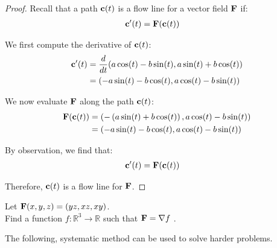 \begin{proof}

Recall that a path \(\vb{c}(t)\) is a flow line for a vector field \(\vb{F}\) if:
\begin{align}
    \vb{c}'(t) &= \vb{F}(\vb{c}(t))
\end{align}

We first compute the derivative of \(\vb{c}(t)\):
\begin{align*}
    \vb{c}'(t) &= \frac{d}{dt}(a \cos(t) - b \sin(t) , a \sin(t) + b \cos(t)) \\
    &= (-a \sin(t) - b \cos(t) , a \cos(t) - b \sin(t))
\end{align*}

We now evaluate \(\vb{F}\) along the path \(\vb{c}(t)\):
\begin{align*}
    \vb{F}(\vb{c}(t)) &= \left(- \left(a\sin(t) + b\cos(t)\right), a \cos(t) - b\sin(t)\right) \\
    &= \left(- a\sin(t) - b\cos(t), a \cos(t) - b\sin(t)\right)
\end{align*}

By observation, we find that:
\begin{align}
    \vb{c}'(t) &= \vb{F}(\vb{c}(t))
\end{align}

Therefore, \(\vb{c}(t)\) is a flow line for \(\vb{F}\).
\end{proof}

\begin{tcolorbox}[
        title={Problem 21 (a)},
        valign=center,
        nobeforeafter,
        colframe=gray!95!black
    ]
Let \(\vb{F}(x, y, z) = (yz, xz, xy)\). \\

Find a function \(f : \mathbb{R}^3 \rightarrow \mathbb{R}\) such that \(\vb{F} = \nabla f\) .
\end{tcolorbox}

The following, systematic method can be used to solve harder problems. 

